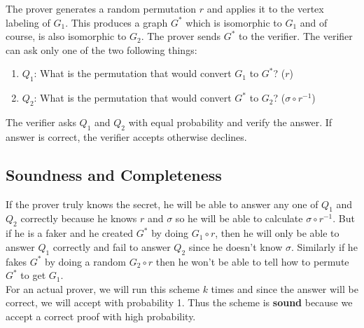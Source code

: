 The prover generates a random permutation $r$ and applies it to the vertex labeling of $G_1$. This 
produces a graph $G^*$ which is isomorphic to $G_1$ and of course, is also isomorphic to $G_2$. The prover 
sends $G^*$ to the verifier. The verifier can ask only one of the two following things:

\begin{enumerate}
	\item $Q_1$: What is the permutation that would convert $G_1$ to $G^*$? ($r$)
	\item $Q_2$: What is the permutation that would convert $G^*$ to $G_2$? ($\sigma \circ r^{-1}$)
\end{enumerate}

\vspace{0.5em}
\begin{center}
\end{center}

The verifier asks $Q_1$ and $Q_2$ with equal probability and verify the answer. If answer is 
correct, the verifier accepts otherwise declines.

\subsection{Soundness and Completeness}
If the prover truly knows the secret, he will be able to answer any one of $Q_1$ and $Q_2$ correctly because 
he knows $r$ and $\sigma$ so he will be able to calculate $\sigma \circ r^{-1}$. But if he is a faker and he 
created $G^*$ by doing $G_1 \circ r$, then he will only be able to answer $Q_1$ correctly and fail 
to answer $Q_2$ since he doesn't know $\sigma$. Similarly if he fakes $G^*$ by doing a random $G_2 \circ r$ 
then he won't be able to tell how to permute $G^*$ to get $G_1$.\\ 

For an actual prover, we will run this scheme $k$ times and since the answer will be correct, we will 
accept with probability 1. Thus the scheme is \textbf{sound} because we accept a correct proof with high 
probability.\\

